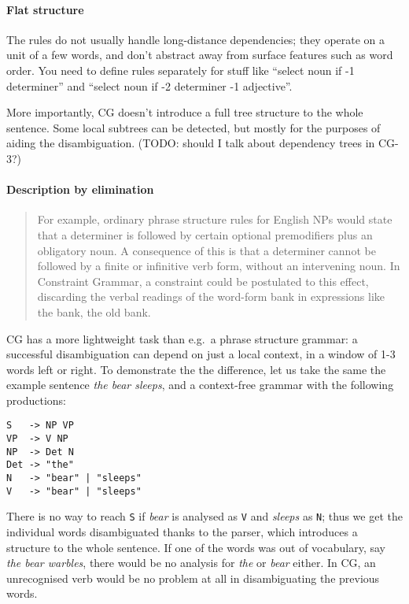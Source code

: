 \paragraph{Flat structure} 

The rules do not usually handle 
long-distance dependencies; they operate on a unit of a few words, and
don't abstract away from surface features such as word order.
You need to define rules separately for stuff like ``select noun if -1
determiner'' and ``select noun if -2 determiner -1 adjective''.

More importantly, CG doesn't introduce a full tree structure to the
whole sentence. Some local subtrees can be detected, but mostly
for the purposes of aiding the disambiguation.
(TODO: should I talk about dependency trees in CG-3?)



\paragraph{Description by elimination} 


\cite{karlsson1995constraint}
\begin{quote}
For example, ordinary phrase structure rules for English NPs would state that a determiner is followed by certain optional premodifiers plus an obligatory noun. A consequence of this is that a determiner cannot be followed by a finite or infinitive verb form, without an intervening noun. In Constraint Grammar, a constraint could be postulated to this effect, discarding the verbal readings of the word-form bank in expressions like the bank, the old bank.
\end{quote}



CG has a more lightweight task than e.g.~a phrase structure grammar: a
successful disambiguation can depend on just a local context, in a
window of 1-3 words left or right. To demonstrate the the difference,
let us take the same the example sentence \emph{the bear sleeps}, and a
context-free grammar with the following productions:


\begin{verbatim}
S   -> NP VP
VP  -> V NP
NP  -> Det N
Det -> "the"
N   -> "bear" | "sleeps"
V   -> "bear" | "sleeps"
\end{verbatim}

There is no way to reach \texttt{S} if \emph{bear} is analysed as
\texttt{V} and \emph{sleeps} as \texttt{N}; thus we get the individual
words disambiguated thanks to the parser, which introduces a structure
to the whole sentence. If one of the words was out of vocabulary, say
\emph{the bear warbles}, there would be no analysis for \emph{the} or
\emph{bear} either. In CG, an unrecognised verb would be no problem at
all in disambiguating the previous words.

